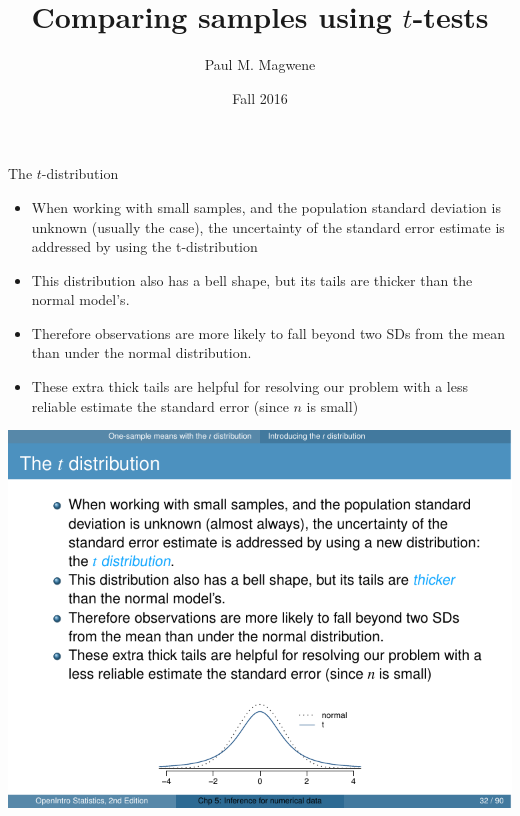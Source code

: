 \documentclass[presentation]{beamer}
\author{Paul M. Magwene}
\date{Fall 2016}
\title{Comparing samples using \(t\)-tests}
\begin{document}
\maketitle

\begin{frame}[label={sec:orgbab9c2e}]{The \(t\)-distribution}
\begin{itemize}
\item When working with small samples, and the population standard deviation is unknown (usually the case), the uncertainty of the standard error estimate is addressed by using the \alert{\alert{t-distribution}}

\item This distribution also has a bell shape, but its tails are thicker than the normal model’s.

\item Therefore observations are more likely to fall beyond two SDs from the mean than under the normal distribution.

\item These extra thick tails are helpful for resolving our problem with a less reliable estimate the standard error (since \(n\) is small)
\end{itemize}

\begin{center}
\includegraphics[height=0.30\textheight]{fig-t-vs-normal.pdf}
\end{center}
\end{frame}
\end{document}
